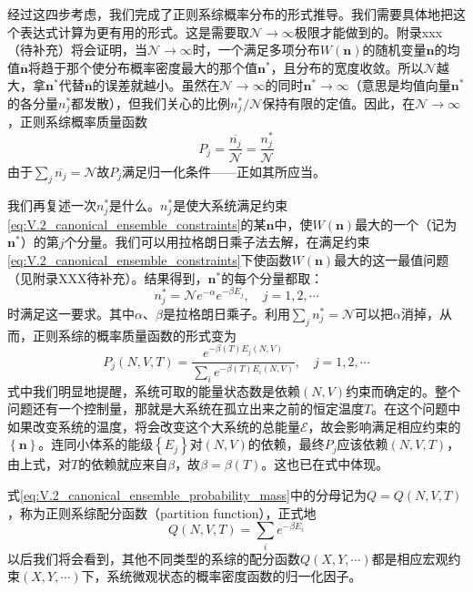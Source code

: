 \documentclass[main.tex]{subfiles}
\begin{document}
经过这四步考虑，我们完成了正则系综概率分布的形式推导。我们需要具体地把这个表达式计算为更有用的形式。这是需要取$\mathcal{N}\rightarrow\infty$极限才能做到的。附录xxx（待补充）将会证明，当$\mathcal{N}\rightarrow\infty$时，一个满足多项分布$W\left(\mathbf{n}\right)$的随机变量$\mathbf{n}$的均值$\overline{\mathbf{n}}$将趋于那个使分布概率密度最大的那个值$\mathbf{n}^*$，且分布的宽度收敛。所以$\mathcal{N}$越大，拿$\mathbf{n}^*$代替$\overline{\mathbf{n}}$的误差就越小。虽然在$\mathcal{N}\rightarrow\infty$的同时$\mathbf{n}^*\rightarrow\infty$（意思是均值向量$\mathbf{n}^*$的各分量$n_j^*$都发散），但我们关心的比例$n_j^*/\mathcal{N}$保持有限的定值。因此，在$\mathcal{N}\rightarrow\infty$，正则系综概率质量函数
\[P_j=\frac{\overline{n_j}}{\mathcal{N}}=\frac{n_j^*}{\mathcal{N}}\]
由于$\sum_j\overline{n_j}=\mathcal{N}$故$P_j$满足归一化条件——正如其所应当。

我们再复述一次$n_j^*$是什么。$n_j^*$是使大系统满足约束\eqref{eq:V.2_canonical_ensemble_constraints}的某$\mathbf{n}$中，使$W\left(\mathbf{n}\right)$最大的一个（记为$\mathbf{n}^*$）的第$j$个分量。我们可以用拉格朗日乘子法去解，在满足约束\eqref{eq:V.2_canonical_ensemble_constraints}下使函数$W\left(\mathbf{n}\right)$最大的这一最值问题（见附录XXX待补充）。结果得到，$\mathbf{n}^*$的每个分量都取：
\[n_j^*=\mathcal{N}e^{-\alpha}e^{-\beta E_j},\quad j=1,2,\cdots\]
时满足这一要求。其中$\alpha$、$\beta$是拉格朗日乘子。利用$\sum_jn_j^*=\mathcal{N}$可以把$\alpha$消掉，从而，正则系综的概率质量函数的形式变为
\begin{equation}\label{eq:V.2_canonical_ensemble_probability_mass}
    P_j\left(N,V,T\right)=\frac{e^{-\beta\left(T\right) E_j\left(N,V\right)}}{\sum_ie^{-\beta\left(T\right) E_i\left(N,V\right)}},\quad j=1,2,\cdots
\end{equation}
式中我们明显地提醒，系统可取的能量状态数是依赖$\left(N,V\right)$约束而确定的。整个问题还有一个控制量，那就是大系统在孤立出来之前的恒定温度$T$。在这个问题中如果改变系统的温度，将会改变这个大系统的总能量$\mathcal{E}$，故会影响满足相应约束的$\left\{\mathbf{n}\right\}$。连同小体系的能级$\left\{E_j\right\}$对$\left(N,V\right)$的依赖，最终$P_j$应该依赖$\left(N,V,T\right)$，由上式，对$T$的依赖就应来自$\beta$，故$\beta=\beta\left(T\right)$。这也已在式中体现。

式\eqref{eq:V.2_canonical_ensemble_probability_mass}中的分母记为$Q=Q\left(N,V,T\right)$，称为正则系综配分函数（partition function），正式地
\[Q\left(N,V,T\right)=\sum_ie^{-\beta E_i}\]
以后我们将会看到，其他不同类型的系综的配分函数$Q\left(X,Y,\cdots\right)$都是相应宏观约束$\left(X,Y,\cdots\right)$下，系统微观状态的概率密度函数的归一化因子。
\end{document}
